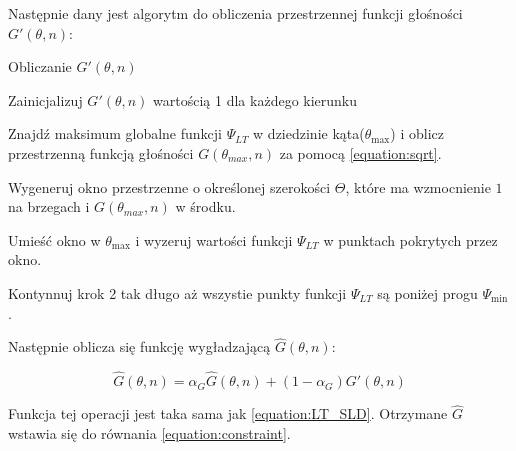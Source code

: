 \noindent Następnie  dany jest algorytm do obliczenia przestrzennej funkcji głośności $G'(\theta,n)$:


\begin{algorithm}
  \label{alg:gprim}
  \caption{Obliczanie $G'(\theta,n)$}
  \begin{algorithmic}[1]
    \State Zainicjalizuj $G'(\theta,n)$ wartością 1 dla każdego kierunku
    
    \State  Znajdź maksimum globalne funkcji $\Psi_{LT}$ w dziedzinie kąta($\theta_{\max}$) i oblicz przestrzenną funkcją głośności $G(\theta_{max},n)$ za pomocą \eqref{equation:sqrt}.
    
    \State Wygeneruj okno przestrzenne o określonej szerokości $\Theta$, które ma wzmocnienie $1$ na brzegach i $G(\theta_{max},n)$ w środku.
    
    \State Umieść okno w $\theta_{\max}$ i wyzeruj wartości funkcji $\Psi_{LT}$ w punktach pokrytych przez okno.
    
    \State Kontynnuj krok 2 tak długo aż wszystie punkty funkcji $\Psi_{LT}$ są poniżej progu $\Psi_{\min}$.
  \end{algorithmic}
\end{algorithm}

\noindent Następnie oblicza się funkcję wygładzającą $\widehat{G}(\theta,n)$:

\begin{equation}
    \label{equation:Ghat}
    \widehat{G}(\theta,n)=
    \alpha_{G}\widehat{G}(\theta,n)
    + (1-\alpha_{G})G'(\theta,n)
\end{equation}


\noindent Funkcja tej operacji jest taka sama jak \eqref{equation:LT_SLD}. Otrzymane $\widehat{G}$ wstawia się do równania \eqref{equation:constraint}.





